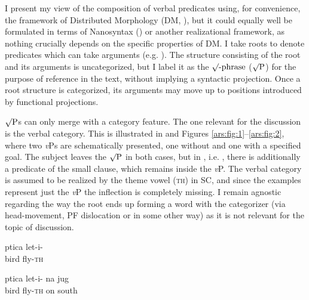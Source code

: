 \documentclass[output=paper]{langscibook}
\begin{document}
I present my view of the composition of verbal predicates using, for convenience, the framework of Distributed Morphology (DM, \citealt{Halle.1993}), but it could equally well be formulated in terms of Nanosyntax (\citealt{Starke.2010}) or another realizational framework, as nothing crucially depends on the specific properties of DM. I take roots to denote predicates which can take arguments (e.g. \citealt{Travis2012}). The structure consisting of the root and its arguments is uncategorized, but I label it as the $\surd\text{-phrase}$ ($\surd\text{P}$) for the purpose of reference in the text, without implying a syntactic projection. Once a root structure is categorized, its arguments may move up to positions introduced by functional projections. 

$\surd\text{P}$s can only merge with a category feature. The one relevant for the discussion is the verbal category. This is illustrated in  and Figures \ref{ars:fig:1}--\ref{ars:fig:2}, where two \textit{v}Ps are schematically presented, one without and one with a specified goal. The subject leaves the $\surd\text{P}$ in both cases, but in , i.e. , there is additionally a predicate of the small clause, which remains inside the \textit{v}P. The verbal category is assumed to be realized by the theme vowel (\textsc{th}) in SC, and since the examples represent just the \textit{v}P the inflection is completely missing. I remain agnostic regarding the way the root ends up forming a word with the categorizer (via head-movement, PF dislocation or in some other way) as it is not relevant for the topic of discussion.

\ea\label{ars:ex:rootp}
		\begin{xlist}
	
	    \ex  \gll ptica let-i-\\ 
        bird fly-\textsc{th}\\ \label{ars:ex:rootpa}
	    
	    \ex  \gll ptica let-i- na jug\\ 
        bird fly-\textsc{th} on south\\ \label{ars:ex:rootpb}

	    \end{xlist}
\z
\end{document}
